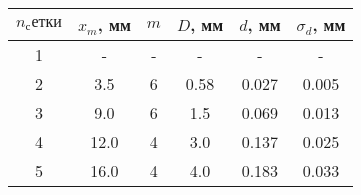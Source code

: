 \begin{tabular}{| c | c | c | c | c | c |}
    \hline
    $n_сетки$ & $x_m$, мм & $m$ & $D$, мм & $d$, мм & $\sigma_d$, мм\\
    \hline
    1 & - & - & - & - & - \\
    \hline
    2 & 3.5 & 6 & 0.58 & 0.027 & 0.005\\
    \hline
    3 & 9.0 & 6 & 1.5 & 0.069  & 0.013\\
    \hline
    4 & 12.0 & 4 & 3.0 & 0.137 & 0.025\\
    \hline
    5 & 16.0 & 4 & 4.0 & 0.183 & 0.033\\
    \hline
    \end{tabular}
    